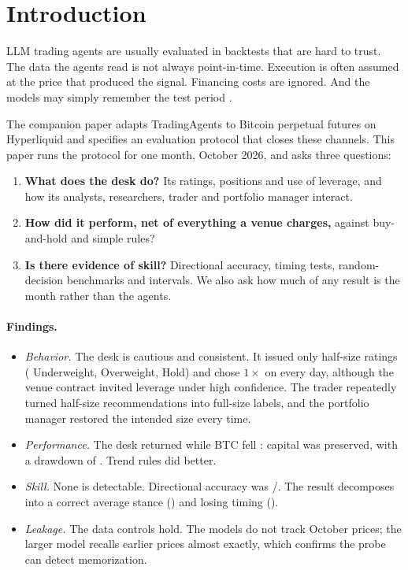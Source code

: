 \section{Introduction}

LLM trading agents are usually evaluated in backtests that are hard to trust. The data the agents read is not always point-in-time. Execution is often assumed at the price that produced the signal. Financing costs are ignored. And the models may simply remember the test period \citep{glasserman2023assessing,lopezlira2025memorization}.

The companion paper adapts TradingAgents \citep{xiao2024tradingagents} to Bitcoin perpetual futures on Hyperliquid and specifies an evaluation protocol that closes these channels. This paper runs the protocol for one month, October 2026, and asks three questions:

\begin{enumerate}
\item \textbf{What does the desk do?} Its ratings, positions and use of leverage, and how its analysts, researchers, trader and portfolio manager interact.
\item \textbf{How did it perform, net of everything a venue charges,} against buy-and-hold and simple rules?
\item \textbf{Is there evidence of skill?} Directional accuracy, timing tests, random-decision benchmarks and intervals. We also ask how much of any result is the month rather than the agents.
\end{enumerate}

\paragraph{Findings.}
\begin{itemize}
\item \emph{Behavior.} The desk is cautious and consistent. It issued only half-size ratings (\NUnderweight{} Underweight, \NOverweight{} Overweight, \NHold{} Hold) and chose $1\times$ on every day, although the venue contract invited leverage under high confidence. The trader repeatedly turned half-size recommendations into full-size labels, and the portfolio manager restored the intended size every time.
\item \emph{Performance.} The desk returned \AgentRet{} while BTC fell \BTCWindow{}: capital was preserved, with a drawdown of \AgentMDD{}. Trend rules did better.
\item \emph{Skill.} None is detectable. Directional accuracy was \DirHits{}/\DirN{}. The result decomposes into a correct average stance (\AttrStatic{}) and losing timing (\AttrActive{}).
\item \emph{Leakage.} The data controls hold. The models do not track October prices; the larger model recalls earlier prices almost exactly, which confirms the probe can detect memorization.
\end{itemize}
